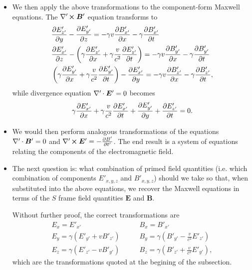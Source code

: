 \documentclass[11pt, a4paper]{article}
\renewcommand{\vec}[1]{\bm{#1}} %
\newcommand{\E}{\vec{E}} %
\newcommand{\B}{\vec{B}} %
\newcommand{\divp}{\nabla' \mspace{-1mu} \cdot}  %
\newcommand{\curlp}{\nabla' \mspace{-2mu} \cross}
\begin{document}
\begin{itemize}
    \item We then apply the above transformations to the component-form Maxwell equations. The $ \curlp \B' $ equation transforms to
	\begin{align*}
		& \pdv{E'_{z'}}{y} - \pdv{E'_{y'}}{z} = - \gamma v \pdv{B'_{x'}}{x} - \gamma \pdv{B'_{x'}}{t}\\
		& \pdv{E'_{x'}}{z} - \left(\gamma \pdv{E'_{z'}}{x} + \gamma \frac{v}{c^{2}} \pdv{E'_{z'}}{t}\right) = - \gamma v \pdv{B'_{y'}}{x} - \gamma \pdv{B'_{y'}}{t}\\
		& \left(\gamma \pdv{E'_{y'}}{x} + \gamma \frac{v}{c^{2}}\pdv{E'_{y'}}{t}\right) - \pdv{E'_{x'}}{y} = - \gamma v \pdv{B'_{z'}}{x} - \gamma \pdv{B'_{z'}}{t},
	\end{align*}
	while divergence equation $ \divp \E' = 0$ becomes
	\begin{equation*}
		\gamma \pdv{E'_{x'}}{x} + \gamma \frac{v}{c^{2}} \pdv{E'_{x'}}{t} + \pdv{E'_{y'}}{y} + \pdv{E'_{z'}}{t} = 0.
	\end{equation*}
    
    \item We would then perform analogous transformations of the equations $ \divp \B' = 0 $ and $ \curlp \E' = - \pdv{B'}{t'} $. The end result is a system of equations relating the components of the electromagnetic field.
    
    \item The next question is: what combination of primed field quantities (i.e. which combination of components $ E'_{x,y,z} $ and $ B'_{x,y,z} $) should we take so that, when substituted into the above equations, we recover the Maxwell equations in terms of the $ S $ frame field quantities $ \E $ and $ \B $.
	
	Without further proof, the correct transformations are 
    \begin{equation*}
        \begin{array}{ll}
            E_{x} = E'_{x'} & \qquad B_{x} = B'_{x'}\\
            E_{y} = \gamma (E'_{y'} + v B'_{z'}) & \qquad B_{y} = \gamma \left (B'_{y'} - \frac{v}{c^{2}} E'_{z'}\right)\\
            E_{z} = \gamma (E'_{z'} - vB'_{y'}) & \qquad B_{z} = \gamma \left (B'_{z'} + \frac{v}{c^{2}} E'_{y'}\right ),
        \end{array}
    \end{equation*}
    which are the transformations quoted at the begining of the subsection.
\end{itemize}
\end{document}
